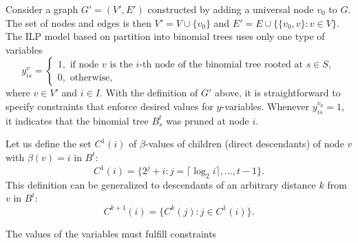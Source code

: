 Consider a graph $G'=(V',E')$ constructed  by adding a universal node $v_0$ to $G$. 
The set of nodes and edges is then $V'=V\cup \{v_0\}$ and $E'=E\cup\{\{v_0,v\}:v\in V\}$.
The ILP model based on partition into binomial trees uses only one type of variables
$$
y_{is}^v=\begin{cases}
1, \text{ if  node } v \text{ is the } i\text{-th node of the binomial tree rooted at } s\in S,\\
0, \text{ otherwise},
\end{cases}
$$
where $v\in V'$ and $i\in I $. 
With the definition of $G'$ above, it is straightforward to specify constraints that enforce desired values for $y$-variables.
Whenever $y_{is}^{v_0}=1$, it indicates that the binomial tree $B^t_s$ was pruned at node $i$.

Let us define the set $C^1(i)$ of $\beta$-values of children (direct descendants) of node $v$ with $\beta(v)=i$ in $B^t$:
\begin{equation}
C^1(i)=\{2^j+i:j=\lceil\log_2 i\rceil,\dots,t-1\}.
\end{equation}
This definition can be generalized to descendants of an arbitrary distance $k$ from $v$ in $B^t$:
\begin{equation}
C^{k+1}(i)=\{C^k(j):j\in C^1(i)\}.
\end{equation}

The values of the variables must fulfill constraints

